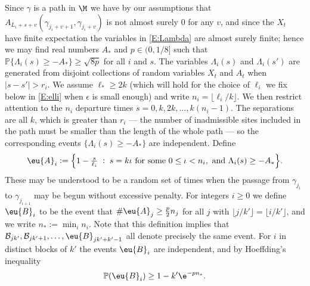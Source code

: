 \documentclass[11pt]{amsart}
\renewcommand{\P}{\mathbb{P}}
\begin{document}
Since $\gamma$ is a path in $\M$ we have by our assumptions that
$A_{L_i+s+v}(\gamma_{j_i+v+1},\gamma_{j_i+v})$ is not almost surely 0 for any $v$, and since the $X_t$ have finite
expectation the variables in \eqref{E:Lambda} are almost surely finite; hence we may find real numbers
$A_*$ and $p\in (0,1/8]$ such that $\P\{\Lambda_{i}(s) \ge -A_*\}\ge \sqrt{8p}$
for all $i$ and $s$.
The variables $\Lambda_i(s)$ and $\Lambda_i(s')$ are generated from disjoint collections of random variables $X_t$ and $A_t$ when $|s-s'|>r_i$.
We assume $\ell_*\ge 2k$ (which will hold for the choice of $\ell_i$ we fix below in \eqref{E:elli} when $\epsilon$ is small enough) and write $n_i=\lfloor \ell_i/k\rfloor$.
We then restrict attention to the $n_i$ departure times $s=0,k,2k,\dots,k(n_i-1)$.
The separations are all $k$, which is greater than $r_i$ --- the number of inadmissible sites included in the path must be smaller than the length of the whole path --- so the corresponding events $\{\Lambda_i(s)\ge -A_*\}$ are independent.
Define
$$
\eu{A}_i := \Bigl\{ 1-\tfrac{s}{\ell_i} \; : \; s=k\iota \text{ for some } 0\le \iota< n_i, \text{ and } \Lambda_i(s)\ge -A_* \Bigr\}.
$$
These may be understood to be a random set of times when the passage from $\gamma_{j_i}$ to $\gamma_{j_{i+1}}$ may be begun without excessive penalty.
For integers $i\ge 0$ we define $\eu{B}_i$ to be the event that $\#\eu{A}_j\ge \frac{p}{2}n_j $ for all $j$ with $\lfloor j/k' \rfloor = \lfloor i/k' \rfloor$, and we write $n_*:=\min_i n_i$.
Note that this definition implies that $\mathcal{B}_{jk'}, \mathcal{B}_{jk'+1},\dots, \eu{B}_{jk'+k'-1}$ all denote precisely the same event.
For $i$ in distinct blocks of $k'$ the events $\eu{B}_{i}$ are independent, and by Hoeffding's inequality
\begin{equation}
	\label{E:Bprob}
	\P (\eu{B}_{i})  \ge 1- k' \e^{-p n_*} .
\end{equation}
\end{document}
